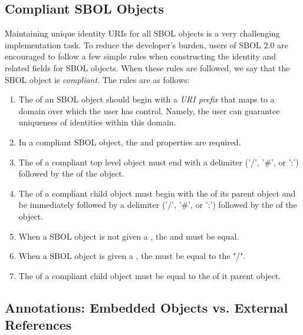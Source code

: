 

\subsection{Compliant SBOL Objects}
\label{sec:compliant}

Maintaining unique identity URIs for all SBOL objects is a very challenging implementation task.  To reduce the developer's burden, users of SBOL 2.0 are encouraged to follow a few simple rules when constructing the identity and related fields for SBOL objects.  When these rules are followed, we say that the SBOL object is \emph{compliant}.  The rules are as follows:
\begin{enumerate}
\item The  of an SBOL object should begin with a \emph{URI prefix} that maps to a domain over which the user has control.  Namely, the user can guarantee uniqueness of identities within this domain.
\item In a compliant SBOL object, the  and  properties are required.
\item The  of a compliant top level object must end with a delimiter ('/', '\#', or ':') followed by the  of the object. 
\item The  of a compliant child object must begin with the  of its parent object and be immediately followed by a delimiter ('/', '\#', or ':') followed by the  of the object.
\item When a SBOL object is not given a , the  and  must be equal.
\item When a SBOL object is given a , the  must be equal to the "/".
\item The  of a compliant child object must be equal to the  of it parent object.
\end{enumerate}

\subsection{Annotations: Embedded Objects vs. External References}

